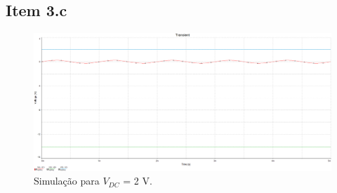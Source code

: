 \documentclass[11pt]{article}
\begin{document}
\pagebreak

\subsection*{Item 3.c}

\begin{figure}[h!]
  \centering
  \includegraphics[width=\textwidth]{fig/sim3c}
  \caption{Simulação para $V_{DC}$ = 2 V.}
\end{figure}
\end{document}
